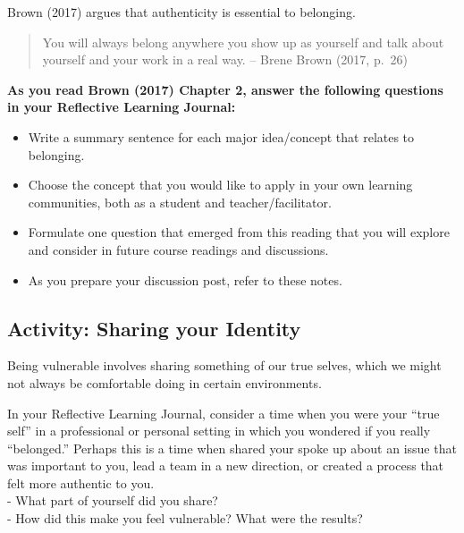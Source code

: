 \documentclass[
]{book}
\providecommand{\tightlist}{%
  \setlength{\itemsep}{0pt}\setlength{\parskip}{0pt}}
\begin{document}
\begin{reflect}
Brown (2017) argues that authenticity is essential to belonging.

\begin{quote}
You will always belong anywhere you show up as yourself and talk about
yourself and your work in a real way. -- Brene Brown (2017, p.~26)
\end{quote}

\textbf{As you read Brown (2017) Chapter 2, answer the following
questions in your Reflective Learning Journal:}

\begin{itemize}
\tightlist
\item
  Write a summary sentence for each major idea/concept that relates to
  belonging.\\
\item
  Choose the concept that you would like to apply in your own learning
  communities, both as a student and teacher/facilitator.\\
\item
  Formulate one question that emerged from this reading that you will
  explore and consider in future course readings and discussions.\\
\item
  As you prepare your discussion post, refer to these notes.
\end{itemize}
\end{reflect}

\hypertarget{activity-sharing-your-identity}{%
\subsection*{Activity: Sharing your Identity}\label{activity-sharing-your-identity}}

\begin{reflect}
Being vulnerable involves sharing something of our true selves, which we
might not always be comfortable doing in certain environments.

In your Reflective Learning Journal, consider a time when you were your
``true self'' in a professional or personal setting in which you
wondered if you really ``belonged.'' Perhaps this is a time when shared
your spoke up about an issue that was important to you, lead a team in a
new direction, or created a process that felt more authentic to you.\\
- What part of yourself did you share?\\
- How did this make you feel vulnerable? What were the results?
\end{reflect}
\end{document}
